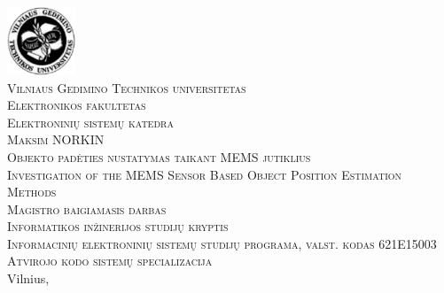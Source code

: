 \documentclass[]{vgtuef}
\begin{document}
  \begin{titlepage}
    \begin{center}
      \includegraphics[width=58pt]{img/vgtu_logo.png}\\
      \textsc{\LARGE Vilniaus Gedimino Technikos universitetas}\\[1mm]
      \textsc{\Large Elektronikos fakultetas}\\[1mm]
      \textsc{\Large Elektroninių sistemų katedra}\\[40mm]
      \textsc{\Large Maksim NORKIN}\\[1mm]
      \textsc{\Large Objekto padėties nustatymas taikant MEMS jutiklius}\\[15mm]
      \textsc{\Large Investigation of the MEMS Sensor Based Object Position Estimation Methods}\\[10mm]
      \textsc{\large Magistro baigiamasis darbas}\\[10mm]
      \textsc{Informatikos inžinerijos studijų kryptis}\\
      \textsc{Informacinių elektroninių sistemų studijų programa, valst. kodas 621E15003}\\
      \textsc{Atvirojo kodo sistemų specializacija}\\
      \vfill
      {\large Vilnius, \the\year}
    \end{center}
  \end{titlepage}

  \newpage\null\thispagestyle{empty}\newpage
\end{document}
